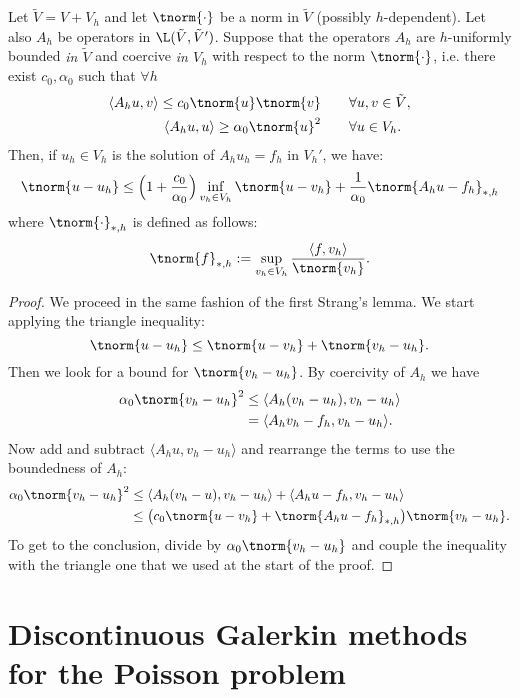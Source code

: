 \begin{lemma}
Let $\tilde{V} = V + V_h$ and let $\tnorm{\cdot}$ be a norm in $\tilde{V}$ (possibly $h$-dependent). Let also $A_h$ be operators in $\L(\tilde{V},\tilde{V}')$. Suppose that the operators $A_h$ are $h$-uniformly bounded \emph{in $\tilde{V}$} and coercive \emph{in $V_h$} with respect to the norm $\tnorm{\cdot}$, i.e. there exist $c_0, \alpha_0$ such that $\forall h$
\begin{align}
\langle A_h u, v \rangle \le c_0 \tnorm{u} \tnorm{v} \qquad &\forall u,v \in \tilde{V}, \\
\langle A_h u, u \rangle \ge \alpha_0 \tnorm{u}^2 \qquad &\forall u \in V_h.
\end{align}
Then, if $u_h \in V_h$ is the solution of $A_h u_h = f_h$ in ${V_h}'$, we have:
\[
\tnorm{u-u_h} \le \Bigl(1 + \frac{c_0}{\alpha_0} \Bigr) \inf_{v_h \in V_h} \tnorm{u-v_h} + \frac{1}{\alpha_0} \tnorm{A_h u - f_h}_{*,h}
\]
where $\tnorm{\cdot}_{*,h}$ is defined as follows:
\[
\tnorm{f}_{*,h} := \sup_{v_h \in V_h} \frac{\langle f, v_h \rangle}{\tnorm{v_h}}.
\]
\end{lemma}
\begin{proof}
We proceed in the same fashion of the first Strang's lemma. We start applying the triangle inequality:
\[
\tnorm{u-u_h} \le \tnorm{u-v_h} + \tnorm{v_h - u_h}.
\]
Then we look for a bound for $\tnorm{v_h - u_h}$. By coercivity of $A_h$ we have
\begin{align}
\alpha_0 \tnorm{v_h - u_h}^2 &\le \langle A_h(v_h - u_h), v_h- u_h \rangle \\
&= \langle A_h v_h - f_h , v_h- u_h \rangle.
\end{align}
Now add and subtract $\langle A_h u, v_h- u_h \rangle$ and rearrange the terms to use the boundedness of $A_h$:
\begin{align}
\alpha_0 \tnorm{v_h - u_h}^2 &\le  \langle A_h (v_h - u), v_h- u_h \rangle +
\langle A_h u - f_h, v_h- u_h \rangle \\
& \le \bigl( c_0 \tnorm{u-v_h} + \tnorm{A_h u - f_h}_{*,h} \bigr)
\tnorm{v_h - u_h}.
\end{align}
To get to the conclusion, divide by $\alpha_0 \tnorm{v_h - u_h}$ and couple the inequality with the triangle one that we used at the start of the proof.
\end{proof}



\section{Discontinuous Galerkin methods for the Poisson problem}

